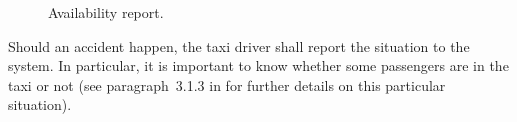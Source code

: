 \begin{figure}%
	\hfill%
	\hfill%
	\caption{Availability report.}\label{fig:availReport}
\end{figure}


\clearpage

Should an accident happen, the taxi driver shall report the situation to the system. In particular, it is important to know whether some passengers are in the taxi or not (see paragraph~3.1.3 in \rasd for further details on this particular situation).  

